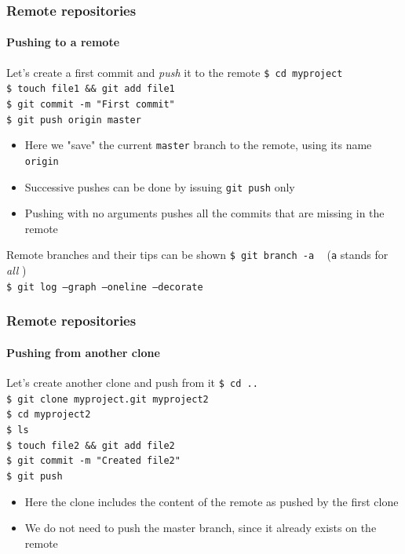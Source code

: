 \begin{frame}
\frametitle{Remote repositories}
\framesubtitle{Pushing to a remote}

\begin{block}{Let's create a first commit and {\em push} it to the remote}
\texttt{\$ cd myproject} \\
\texttt{\$ touch file1 \&\& git add file1} \\
\texttt{\$ git commit -m "First commit"} \\
\texttt{\$ git push origin master}

\begin{itemize}
\item Here we "save" the current \texttt{master} branch to the remote, using its name \texttt{origin}
\item Successive pushes can be done by issuing \texttt{git push} only
\item Pushing with no arguments pushes all the commits that are missing in the remote
\end{itemize}
\end{block}

\pause
\begin{block}{Remote branches and their tips can be shown}
\texttt{\$ git branch -a} \,\,\, (\texttt{a} stands for {\em all} ) \\
\texttt{\$ git log ---graph ---oneline ---decorate}
\end{block}

\end{frame}

\begin{frame}
\frametitle{Remote repositories}
\framesubtitle{Pushing from another clone}

\begin{block}{Let's create another clone and push from it}
\texttt{\$ cd ..} \\
\texttt{\$ git clone myproject.git myproject2} \\
\texttt{\$ cd myproject2} \\
\texttt{\$ ls} \\
\texttt{\$ touch file2 \&\& git add file2} \\
\texttt{\$ git commit -m "Created file2"} \\
\texttt{\$ git push}

\begin{itemize}
\item Here the clone includes the content of the remote as pushed by the first clone
\item We do not need to push the master branch, since it already exists on the remote
\end{itemize}
\end{block}

\end{frame}

